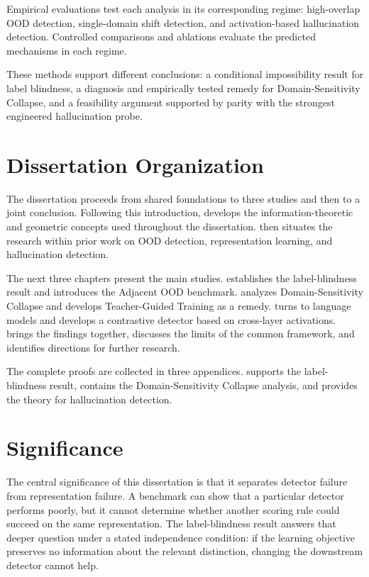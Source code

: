 Empirical evaluations test each analysis in its corresponding regime:
high-overlap OOD detection, single-domain shift detection, and activation-based
hallucination detection. Controlled comparisons and ablations evaluate the
predicted mechanisms in each regime.

These methods support different conclusions: a conditional impossibility result
for label blindness, a diagnosis and empirically tested remedy for
Domain-Sensitivity Collapse, and a feasibility argument supported by parity with
the strongest engineered hallucination probe.

\section{Dissertation Organization}
\label{sec:intro:organization}

The dissertation proceeds from shared foundations to three studies and then to a
joint conclusion. Following this introduction,  develops the
information-theoretic and geometric concepts used throughout the dissertation.
 then situates the research within prior work on OOD
detection, representation learning, and hallucination detection.

The next three chapters present the main studies. 
establishes the label-blindness result and introduces the Adjacent OOD benchmark.
 analyzes Domain-Sensitivity Collapse and
develops Teacher-Guided Training as a remedy. 
turns to language models and develops a contrastive detector based on cross-layer
activations.  brings the findings together, discusses the
limits of the common framework, and identifies directions for further research.

The complete proofs are collected in three appendices. 
supports the label-blindness result,  contains the
Domain-Sensitivity Collapse analysis, and 
provides the theory for hallucination detection.

\section{Significance}
\label{sec:intro:significance}

The central significance of this dissertation is that it separates detector
failure from representation failure. A benchmark can show that a particular
detector performs poorly, but it cannot determine whether another scoring rule
could succeed on the same representation. The label-blindness result answers
that deeper question under a stated independence condition: if the learning
objective preserves no information about the relevant distinction, changing the
downstream detector cannot help.

